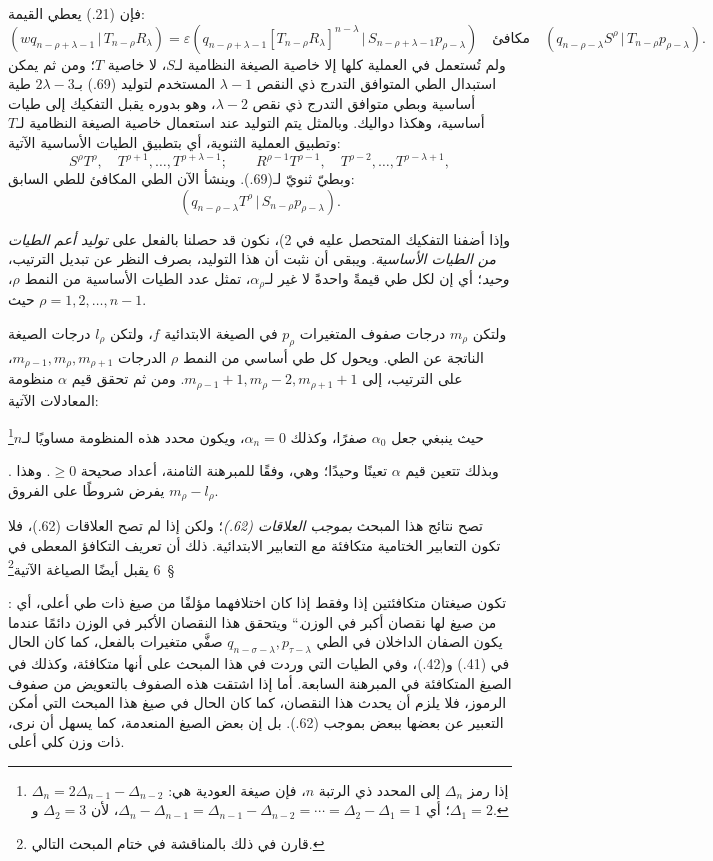 \documentclass[11pt]{article}
\providecommand{\glqq}{\textquotedblbase}
\providecommand{\grqq}{\textquotedblleft}
\providecommand{\srcnumdisplay}[3][3.4em]{%
  \par\smallskip\noindent
  \babelsublr{\begin{minipage}[t]{#1}\vspace*{0pt}\srcLTR{#2}\end{minipage}%
  \begin{minipage}[t]{\dimexpr\linewidth-#1\relax}\vspace*{0pt}\centering
  \(\displaystyle #3\)\end{minipage}}\par\smallskip}
\newcommand{\srcLTR}[1]{\relax\ifmmode\text{\mbox{\babelsublr{\foreignlanguage{english}{#1}}}}\else\babelsublr{\foreignlanguage{english}{#1}}\fi}
\newcommand{\srcfn}[2]{\begingroup\renewcommand{\thefootnote}{\srcLTR{#1}}\footnote{#2}\addtocounter{footnote}{-1}\endgroup}
\providecommand{\pair}[2]{(#1\,|\,#2)}
\providecommand{\eps}{\varepsilon}
\begin{document}
فإن (21.) يعطي القيمة:
\[
 \pair{wq_{n-\rho+\lambda-1}}{T_{n-\rho}R_\lambda}
 =\eps\pair{q_{n-\rho+\lambda-1}[T_{n-\rho}R_\lambda]^{n-\lambda}}{S_{n-\rho+\lambda-1}p_{\rho-\lambda}}
 \quad\text{مكافئ}\quad
 \pair{q_{n-\rho-\lambda}S^\rho}{T_{n-\rho}p_{\rho-\lambda}}.
\]
ولم تُستعمل في العملية كلها إلا خاصية الصيغة النظامية لـ$S$، لا خاصية $T$؛ ومن ثم يمكن استبدال الطي المتوافق التدرج ذي النقص $\lambda-1$ المستخدم لتوليد (69.) بـ$2\lambda-3$ طية أساسية وبطي متوافق التدرج ذي نقص $\lambda-2$، وهو بدوره يقبل التفكيك إلى طيات أساسية، وهكذا دواليك. وبالمثل يتم التوليد عند استعمال خاصية الصيغة النظامية لـ$T$ وتطبيق العملية الثنوية، أي بتطبيق الطيات الأساسية الآتية:
\[
 S^\rho T^\rho,\quad T^{\rho+1},\ldots,T^{\rho+\lambda-1};
 \qquad R^{\rho-1}T^{\rho-1},\quad T^{\rho-2},\ldots,T^{\rho-\lambda+1},
\]
وبطيّ ثنويّ لـ(69.). وينشأ الآن الطي المكافئ للطي السابق:
\[
 \pair{q_{n-\rho-\lambda}T^\rho}{S_{n-\rho}p_{\rho-\lambda}}.
\]

وإذا أضفنا التفكيك المتحصل عليه في 2)، نكون قد حصلنا بالفعل على \emph{توليد أعم الطيات من الطيات الأساسية}. ويبقى أن نثبت أن هذا التوليد، بصرف النظر عن تبديل الترتيب، \emph{وحيد}؛ أي إن لكل طي قيمةً واحدةً لا غير لـ$\alpha_\rho$، تمثل عدد الطيات الأساسية من النمط $\rho$، حيث $\rho=1,2,\ldots,n-1$.

ولتكن $m_\rho$ درجات صفوف المتغيرات $p_\rho$ في الصيغة الابتدائية $f$، ولتكن $l_\rho$ درجات الصيغة الناتجة عن الطي. ويحول كل طي أساسي من النمط $\rho$ الدرجات $m_{\rho-1},m_\rho,m_{\rho+1}$، على الترتيب، إلى $m_{\rho-1}+1,m_\rho-2,m_{\rho+1}+1$. ومن ثم تحقق قيم $\alpha$ منظومة المعادلات الآتية:
\srcnumdisplay[4.2em]{(70.)}{%
 m_\rho-l_\rho=-\alpha_{\rho-1}+2\alpha_\rho-\alpha_{\rho+1},
 \qquad (\rho=1,2,\ldots,n-1)}
حيث ينبغي جعل $\alpha_0$ صفرًا، وكذلك $\alpha_n=0$، ويكون محدد هذه المنظومة مساويًا لـ$n$\srcfn{*)}{إذا رمز $\Delta_n$ إلى المحدد ذي الرتبة $n$، فإن صيغة العودية هي: $\Delta_n=2\Delta_{n-1}-\Delta_{n-2}$؛ أي $\Delta_n-\Delta_{n-1}=\Delta_{n-1}-\Delta_{n-2}=\cdots=\Delta_2-\Delta_1=1$، لأن $\Delta_2=3$ و$\Delta_1=2$.}. وبذلك تتعين قيم $\alpha$ تعينًا وحيدًا؛ وهي، وفقًا للمبرهنة الثامنة، أعداد صحيحة $\ge0$. وهذا يفرض شروطًا على الفروق $m_\rho-l_\rho$.

تصح نتائج هذا المبحث \emph{بموجب العلاقات (62.)}؛ ولكن إذا لم تصح العلاقات (62.)، فلا تكون التعابير الختامية متكافئة مع التعابير الابتدائية. ذلك أن تعريف التكافؤ المعطى في \S\ 6 يقبل أيضًا الصياغة الآتية\srcfn{**)}{قارن في ذلك بالمناقشة في ختام المبحث التالي.}: \glqq{}تكون صيغتان متكافئتين إذا وفقط إذا كان اختلافهما مؤلفًا من صيغ ذات طي أعلى، أي من صيغ لها نقصان أكبر في الوزن.\grqq{} ويتحقق هذا النقصان الأكبر في الوزن دائمًا عندما يكون الصفان الداخلان في الطي $q_{n-\sigma-\lambda},p_{\tau-\lambda}$ صفَّي متغيرات بالفعل، كما كان الحال في (41.) و(42.)، وفي الطيات التي وردت في هذا المبحث على أنها متكافئة، وكذلك في الصيغ المتكافئة في المبرهنة السابعة. أما إذا اشتقت هذه الصفوف بالتعويض من صفوف الرموز، فلا يلزم أن يحدث هذا النقصان، كما كان الحال في صيغ هذا المبحث التي أمكن التعبير عن بعضها ببعض بموجب (62.). بل إن بعض الصيغ المنعدمة، كما يسهل أن نرى، ذات وزن كلي أعلى.
\end{document}
